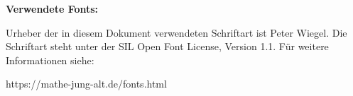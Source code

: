\newpage

{\bf Verwendete Fonts:} \par

Urheber der in diesem Dokument verwendeten Schriftart ist Peter Wiegel. Die Schriftart steht unter der SIL Open Font License, Version 1.1.
Für weitere Informationen siehe:\par

https://mathe-jung-alt.de/fonts.html